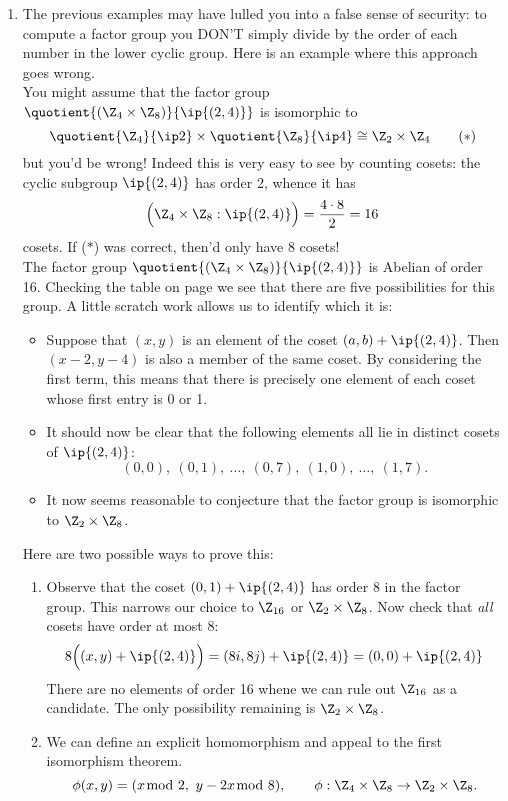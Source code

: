 \begin{enumerate}
\item The previous examples may have lulled you into a false sense of security: to compute a factor group you DON'T simply divide by the order of each number in the lower cyclic group. Here is an example where this approach goes wrong.\\
You might assume that the factor group $\quotient{(\Z_4\times\Z_8)}{\ip{(2,4)}}$ is isomorphic to 
\[\quotient{\Z_4}{\ip 2}\times\quotient{\Z_8}{\ip 4}\cong\Z_2\times\Z_4\tag*{($\ast$)}\]
but you'd be wrong! Indeed this is very easy to see by counting cosets: the cyclic subgroup $\ip{(2,4)}$ has order 2, whence it has
\[\Bigl(\Z_4\times\Z_8:\ip{(2,4)}\Bigr)=\frac{4\cdot 8}2=16\]
cosets. If ($\ast$) was correct, then'd only have 8 cosets!\\
The factor group $\quotient{(\Z_4\times\Z_8)}{\ip{(2,4)}}$ is Abelian of order 16. Checking the table on page \pageref{pg:fundabel} we see that there are five possibilities for this group. A little scratch work allows us to identify which it is:
\begin{itemize}
  \item Suppose that $(x,y)$ is an element of the coset $(a,b)+\ip{(2,4)}$. Then $(x-2,y-4)$ is also a member of the same coset. By considering the first term, this means that there is precisely one element of each coset whose first entry is 0 or 1.
  \item It should now be clear that the following elements all lie in distinct cosets of $\ip{(2,4)}$:
	\[(0,0),\ (0,1),\ \ldots,\ (0,7),\ (1,0),\ \ldots,\ (1,7).\]
	\item It now seems reasonable to conjecture that the factor group is isomorphic to $\Z_2\times\Z_8$.
\end{itemize}
	Here are two possible ways to prove this:
\begin{enumerate}
  \item Observe that the coset $(0,1)+\ip{(2,4)}$ has order 8 in the factor group. This narrows our choice to $\Z_{16}$ or $\Z_2\times\Z_8$. Now check that \emph{all} cosets have order at most 8:
  \[8\Bigl((x,y)+\ip{(2,4)}\Bigr)=(8i,8j)+\ip{(2,4)}=(0,0)+\ip{(2,4)}\]
  There are no elements of order 16 whene we can rule out $\Z_{16}$ as a candidate. The only possibility remaining is $\Z_2\times\Z_8$.
  \item We can define an explicit homomorphism and appeal to the first isomorphism theorem.
	\[\phi(x,y)=(x\negthickspace\negthickspace\mod 2,\ y-2x\negthickspace\negthickspace\mod 8),\qquad \phi:\Z_4\times \Z_8\to\Z_2\times\Z_8.\]

\end{enumerate}
\end{enumerate}

